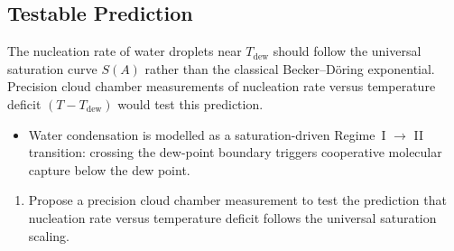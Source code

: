 \subsection{Testable Prediction}

The nucleation rate of water droplets near $T_{\mathrm{dew}}$
should follow the universal saturation curve $S(A)$
rather than the classical Becker--D\"{o}ring exponential.
Precision cloud chamber measurements of nucleation rate versus
temperature deficit $(T - T_{\mathrm{dew}})$ would test this
prediction.

\begin{summarybox}
\begin{itemize}
    \item Water condensation is modelled as a saturation-driven Regime~I $\to$ II transition: crossing the dew-point boundary triggers cooperative molecular capture below the dew point.
\end{itemize}
\end{summarybox}

\begin{exercisebox}
\begin{enumerate}
    \item Propose a precision cloud chamber measurement to test the prediction that nucleation rate versus temperature deficit follows the universal saturation scaling.
\end{enumerate}
\end{exercisebox}

